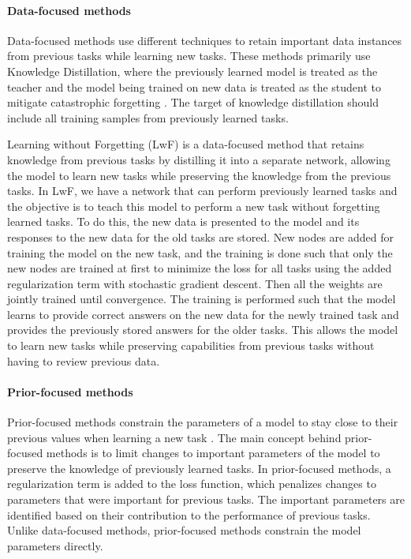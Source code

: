 \paragraph{Data-focused methods} 
Data-focused methods use different techniques to retain important data instances from previous tasks while learning new tasks. These methods primarily use Knowledge Distillation, where the previously learned model is treated as the teacher and the model being trained on new data is treated as the student to mitigate catastrophic forgetting \cite{de2021continual}. The target of knowledge distillation should include all training samples from previously learned tasks. 

Learning without Forgetting (LwF) \cite{li2017learning} is a data-focused method that retains knowledge from previous tasks by distilling it into a separate network, allowing the model to learn new tasks while preserving the knowledge from the previous tasks. In LwF, we have a network that can perform previously learned tasks and the objective is to teach this model to perform a new task without forgetting learned tasks. To do this, the new data is presented to the model and its responses to the new data for the old tasks are stored. New nodes are added for training the model on the new task, and the training is done such that only the new nodes are trained at first to minimize the loss for all tasks using the added regularization term with stochastic gradient descent. Then all the weights are jointly trained until convergence. The training is performed such that the model learns to provide correct answers on the new data for the newly trained task and provides the previously stored answers for the older tasks. This allows the model to learn new tasks while preserving capabilities from previous tasks without having to review previous data.

\paragraph{Prior-focused methods}
Prior-focused methods constrain the parameters of a model to stay close to their previous values when learning a new task \cite{de2021continual}. The main concept behind prior-focused methods is to limit changes to important parameters of the model to preserve the knowledge of previously learned tasks. In prior-focused methods, a regularization term is added to the loss function, which penalizes changes to parameters that were important for previous tasks. The important parameters are identified based on their contribution to the performance of previous tasks. Unlike data-focused methods, prior-focused methods constrain the model parameters directly. 

